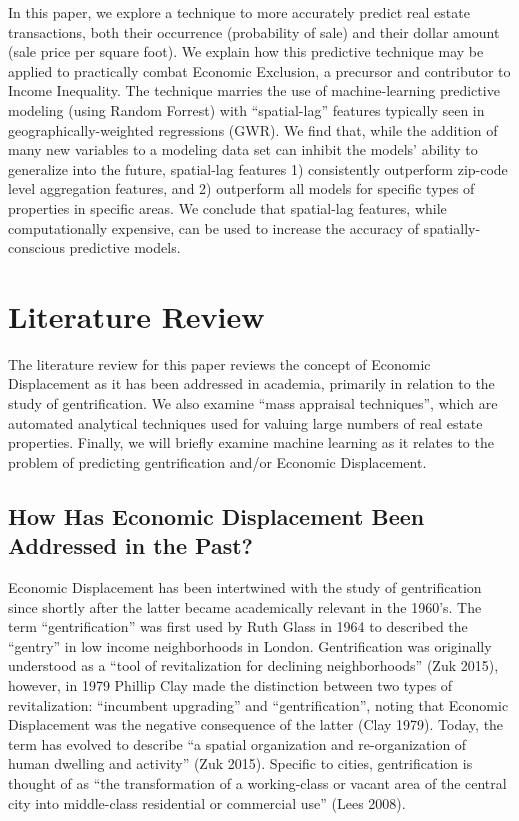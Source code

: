 \documentclass[12pt,]{article}
\begin{document}
In this paper, we explore a technique to more accurately predict real
estate transactions, both their occurrence (probability of sale) and
their dollar amount (sale price per square foot). We explain how this
predictive technique may be applied to practically combat Economic
Exclusion, a precursor and contributor to Income Inequality. The
technique marries the use of machine-learning predictive modeling (using
Random Forrest) with ``spatial-lag'' features typically seen in
geographically-weighted regressions (GWR). We find that, while the
addition of many new variables to a modeling data set can inhibit the
models' ability to generalize into the future, spatial-lag features 1)
consistently outperform zip-code level aggregation features, and 2)
outperform all models for specific types of properties in specific
areas. We conclude that spatial-lag features, while computationally
expensive, can be used to increase the accuracy of spatially-conscious
predictive models.

\hypertarget{literature-review}{%
\section{Literature Review}\label{literature-review}}

The literature review for this paper reviews the concept of Economic
Displacement as it has been addressed in academia, primarily in relation
to the study of gentrification. We also examine ``mass appraisal
techniques'', which are automated analytical techniques used for valuing
large numbers of real estate properties. Finally, we will briefly
examine machine learning as it relates to the problem of predicting
gentrification and/or Economic Displacement.

\hypertarget{how-has-economic-displacement-been-addressed-in-the-past}{%
\subsection{How Has Economic Displacement Been Addressed in the
Past?}\label{how-has-economic-displacement-been-addressed-in-the-past}}

Economic Displacement has been intertwined with the study of
gentrification since shortly after the latter became academically
relevant in the 1960's. The term ``gentrification'' was first used by
Ruth Glass in 1964 to described the ``gentry'' in low income
neighborhoods in London. Gentrification was originally understood as a
``tool of revitalization for declining neighborhoods'' (Zuk 2015),
however, in 1979 Phillip Clay made the distinction between two types of
revitalization: ``incumbent upgrading'' and ``gentrification'', noting
that Economic Displacement was the negative consequence of the latter
(Clay 1979). Today, the term has evolved to describe ``a spatial
organization and re-organization of human dwelling and activity'' (Zuk
2015). Specific to cities, gentrification is thought of as ``the
transformation of a working-class or vacant area of the central city
into middle-class residential or commercial use'' (Lees 2008).
\end{document}
